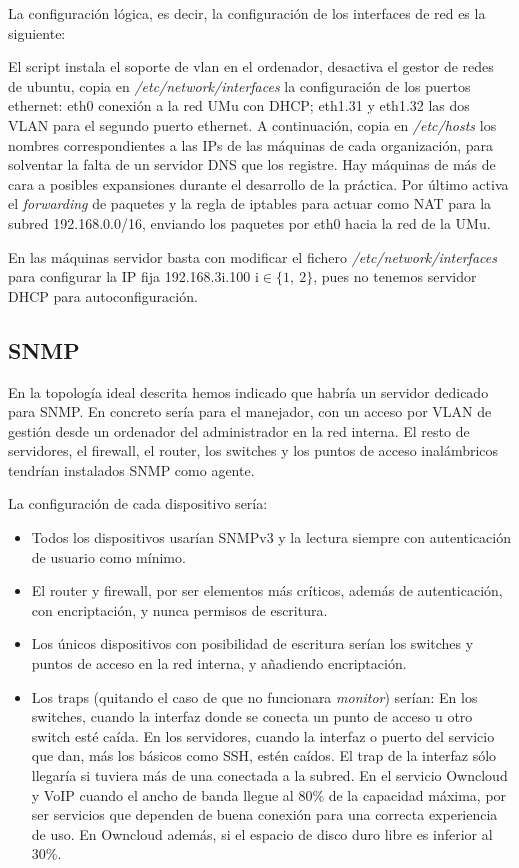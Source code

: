 \documentclass[]{article}
\begin{document}
La configuración lógica, es decir, la configuración de los interfaces de red es la siguiente:



El script instala el soporte de vlan en el ordenador, desactiva el gestor de redes de ubuntu, copia en \textit{/etc/network/interfaces} la configuración de los puertos ethernet: eth0 conexión a la red UMu con DHCP; eth1.31 y eth1.32 las dos VLAN para el segundo puerto ethernet. A continuación, copia en \textit{/etc/hosts} los nombres correspondientes a las IPs de las máquinas de cada organización, para solventar la falta de un servidor DNS que los registre. Hay máquinas de más de cara a posibles expansiones durante el desarrollo de la práctica. Por último activa el \textit{forwarding} de paquetes y la regla de iptables para actuar como NAT para la subred 192.168.0.0/16, enviando los paquetes por eth0 hacia la red de la UMu.

En las máquinas servidor basta con modificar el fichero \textit{/etc/network/interfaces} para configurar la IP fija 192.168.3i.100 i$ \in \{1,\ 2\} $, pues no tenemos servidor DHCP para autoconfiguración.


\subsection{SNMP}

En la topología ideal descrita hemos indicado que habría un servidor dedicado para SNMP. En concreto sería para el manejador, con un acceso por VLAN de gestión desde un ordenador del administrador en la red interna. El resto de servidores, el firewall, el router, los switches y los puntos de acceso inalámbricos tendrían instalados SNMP como agente.

La configuración de cada dispositivo sería:
\begin{itemize}
	\item Todos los dispositivos usarían SNMPv3 y la lectura siempre con autenticación de usuario como mínimo.
	\item El router y firewall, por ser elementos más críticos, además de autenticación, con encriptación, y nunca permisos de escritura.
	\item Los únicos dispositivos con posibilidad de escritura serían los switches y puntos de acceso en la red interna, y añadiendo encriptación.
	\item Los traps (quitando el caso de que no funcionara \textit{monitor}) serían:
		\subitem En los switches, cuando la interfaz donde se conecta un punto de acceso u otro switch esté caída.
		\subitem En los servidores, cuando la interfaz o puerto del servicio que dan, más los básicos como SSH, estén caídos. El trap de la interfaz sólo llegaría si tuviera más de una conectada a la subred.
		\subsubitem En el servicio Owncloud y VoIP cuando el ancho de banda llegue al 80\% de la capacidad máxima, por ser servicios que dependen de buena conexión para una correcta experiencia de uso.
		\subsubitem En Owncloud además, si el espacio de disco duro libre es inferior al 30\%.
\end{itemize}
\end{document}
